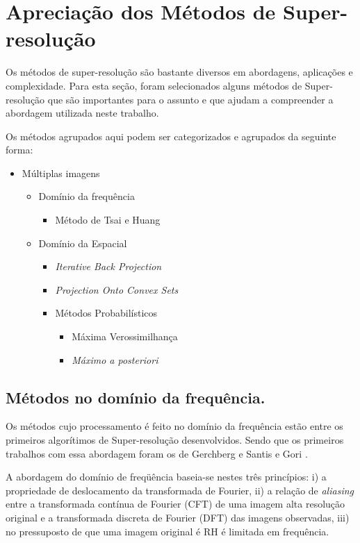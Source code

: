 \section{Apreciação dos Métodos de Super-resolução} 
\label{sec:srmetodos}
Os métodos de super-resolução são bastante diversos em abordagens, aplicações e complexidade. Para esta seção, foram selecionados alguns métodos de Super-resolução que são importantes para o assunto e que ajudam a compreender a abordagem utilizada neste trabalho.

Os métodos agrupados aqui podem ser categorizados e agrupados da seguinte forma:

\begin{itemize}
	\item Múltiplas imagens
	\begin{itemize}
		\item Domínio da frequência
		\begin{itemize}
			\item Método de Tsai e Huang
		\end{itemize}
		\item Domínio da Espacial
		\begin{itemize}
			\item \emph{Iterative Back Projection}
			\item \emph{Projection Onto Convex Sets}
			\item Métodos Probabilísticos
			\begin{itemize}
				\item Máxima Verossimilhança
				\item \emph{Máximo \emph{a posteriori}}
			\end{itemize}
		\end{itemize}
	\end{itemize}
		
\end{itemize}

\subsection{Métodos no domínio da frequência.}

Os métodos cujo processamento é feito no domínio da frequência estão entre os primeiros algorítimos de Super-resolução desenvolvidos.
Sendo que os primeiros trabalhos com essa abordagem foram os de Gerchberg \cite{Gerchberg1974} e Santis e Gori \cite{de1975iterative}.

\begin{citacao}
	A abordagem do domínio de freqüência baseia-se nestes três princípios:
	i) a propriedade de deslocamento da transformada de Fourier,
	ii) a relação de \emph{aliasing} entre a transformada contínua de Fourier (CFT) de uma imagem alta resolução original e a transformada discreta de Fourier (DFT) das imagens observadas,
	iii) no pressuposto de que uma imagem original é RH é limitada em frequência.
\end{citacao}

